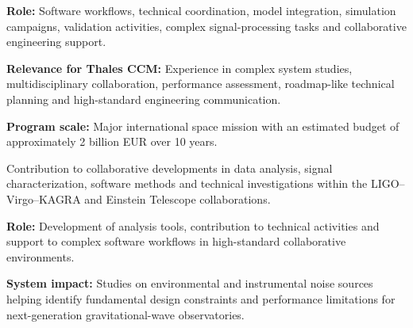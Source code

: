 \documentclass[8pt,a4paper,ragged2e,withhyper]{altacv}
\begin{document}
\textbf{Role:} Software workflows, technical coordination, model integration, simulation campaigns, validation activities, complex signal-processing tasks and collaborative engineering support.

\textbf{Relevance for Thales CCM:} Experience in complex system studies, multidisciplinary collaboration, performance assessment, roadmap-like technical planning and high-standard engineering communication.

\textbf{Program scale:} Major international space mission with an estimated budget of approximately 2 billion EUR over 10 years.

\divider


Contribution to collaborative developments in data analysis, signal characterization, software methods and technical investigations within the LIGO--Virgo--KAGRA and Einstein Telescope collaborations.

\textbf{Role:} Development of analysis tools, contribution to technical activities and support to complex software workflows in high-standard collaborative environments.

\textbf{System impact:} Studies on environmental and instrumental noise sources helping identify fundamental design constraints and performance limitations for next-generation gravitational-wave observatories.


\vspace{-.3cm}


{\small
{}
}

\divider\smallskip
\vspace{-.3cm}


{\small
{}
}
\end{document}

